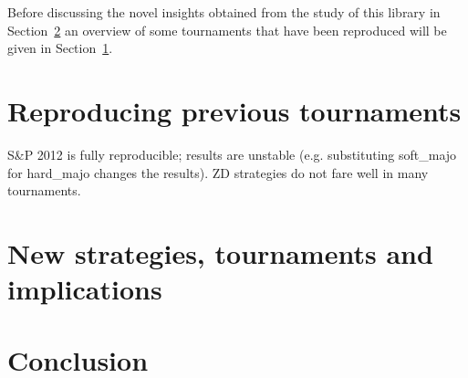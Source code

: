 \documentclass{article}
\begin{document}
Before discussing the novel insights obtained from the study of this library in
Section~\ref{sec:new-strategies-and-implications} an overview of some
tournaments that have been reproduced will be given in
Section~\ref{sec:reproducing-previous-tournaments}.

\section{Reproducing previous tournaments}\label{sec:reproducing-previous-tournaments}

S&P 2012 is fully reproducible; results are unstable (e.g. substituting soft_majo for
hard_majo changes the results). ZD strategies do not fare well in many tournaments.

\section{New strategies, tournaments and implications}\label{sec:new-strategies-and-implications}

\section{Conclusion}\label{sec:conclusion}

\printbibliography
\end{document}
